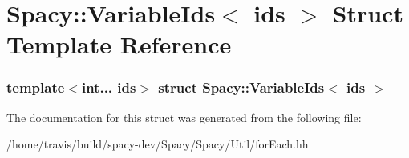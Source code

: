 \hypertarget{structSpacy_1_1VariableIds}{\section{\-Spacy\-:\-:\-Variable\-Ids$<$ ids $>$ \-Struct \-Template \-Reference}
\label{structSpacy_1_1VariableIds}
}
\subsubsection*{template$<$int... ids$>$ struct Spacy\-::\-Variable\-Ids$<$ ids $>$}



\-The documentation for this struct was generated from the following file\-:\begin{DoxyCompactItemize}
\item 
/home/travis/build/spacy-\/dev/\-Spacy/\-Spacy/\-Util/for\-Each.\-hh\end{DoxyCompactItemize}
